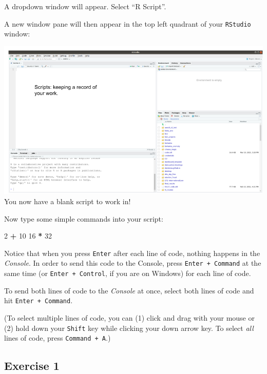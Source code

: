 \documentclass[
]{book}
\newenvironment{Shaded}{\begin{snugshade}}{\end{snugshade}}
\newcommand{\DecValTok}[1]{\textcolor[rgb]{0.00,0.00,0.81}{#1}}
\newcommand{\OperatorTok}[1]{\textcolor[rgb]{0.81,0.36,0.00}{\textbf{#1}}}
\newcommand{\StringTok}[1]{\textcolor[rgb]{0.31,0.60,0.02}{#1}}
\begin{document}
A dropdown window will appear. Select ``R Script''.

A new window pane will then appear in the top left quadrant of your \texttt{RStudio} window:

\includegraphics{img/rstudio_scripts.png}
You now have a blank script to work in!

Now type some simple commands into your script:

\begin{Shaded}
\begin{Highlighting}[]
\DecValTok{2}  \OperatorTok{+}\StringTok{ }\DecValTok{10}
\DecValTok{16} \OperatorTok{*}\StringTok{ }\DecValTok{32}
\end{Highlighting}
\end{Shaded}

Notice that when you press \texttt{Enter} after each line of code, nothing happens in the \emph{Console}. In order to send this code to the Console, press \texttt{Enter\ +\ Command} at the same time (or \texttt{Enter\ +\ Control}, if you are on Windows) for each line of code.

To send both lines of code to the \emph{Console} at once, select both lines of code and hit \texttt{Enter\ +\ Command}.

(To select multiple lines of code, you can (1) click and drag with your mouse or (2) hold down your \texttt{Shift} key while clicking your down arrow key. To select \emph{all} lines of code, press \texttt{Command\ +\ A}.)

\hypertarget{exercise-1-1}{%
\subsection*{Exercise 1}\label{exercise-1-1}}
\end{document}
